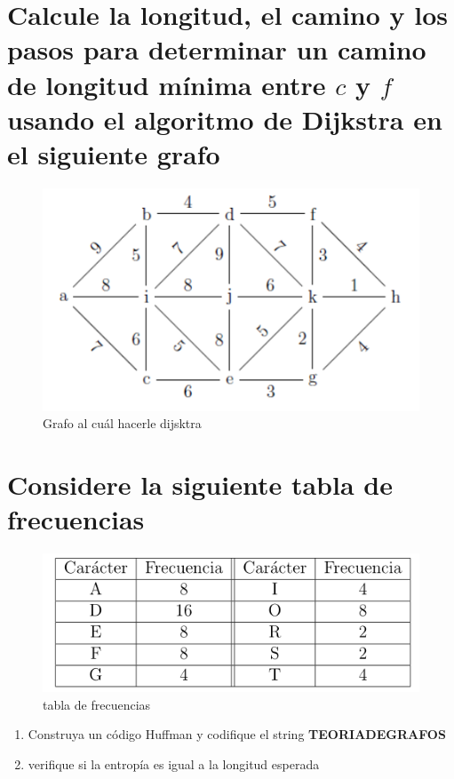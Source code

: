 \documentclass[10pt,a4paper]{article} %
\begin{document}
    \section{Calcule la longitud, el camino y los pasos para determinar un
    camino de longitud mínima entre $c $ y $f$ usando el algoritmo de
    \textbf{Dijkstra} en el siguiente grafo}
        \begin{figure}[h!]
            \centering
            \includegraphics[width=0.5\linewidth]{grafoD.png}
            \caption{Grafo al cuál hacerle dijsktra}
            \label{bre}
        \end{figure}









    \newpage
    \section{Considere la siguiente tabla de frecuencias }
        \begin{figure}[h!]
            \centering
            \includegraphics[width=0.5\linewidth]{frec.png}
            \caption{tabla de frecuencias}
            \label{frecuecias}
        \end{figure}

        \begin{enumerate}
            \item {Construya  un código Huffman y codifique el string
                \textbf{TEORIADEGRAFOS} }
            \item {verifique si la entropía es igual a la longitud esperada}
        \end{enumerate}
\end{document}
